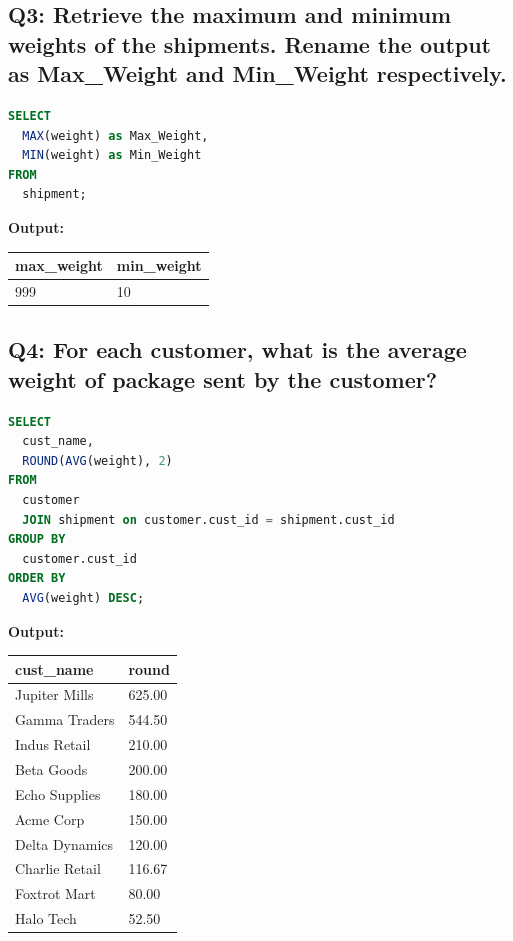 \documentclass[11pt, a4paper]{article}
\begin{document}
\subsection*{Q3: Retrieve the maximum and minimum weights of the shipments. Rename the output as Max\_Weight and Min\_Weight respectively.}
\begin{lstlisting}[language=SQL]
SELECT
  MAX(weight) as Max_Weight,
  MIN(weight) as Min_Weight
FROM
  shipment;
\end{lstlisting}
\vspace{0.3cm}
\textbf{Output:}\vspace{0.2cm}
\begin{center}
\begin{tabular}{|l|l|}
\hline
\textbf{max\_weight} & \textbf{min\_weight} \\ \hline
999 & 10 \\ \hline
\end{tabular}
\end{center}
\newpage
\subsection*{Q4: For each customer, what is the average weight of package sent by the customer?}
\begin{lstlisting}[language=SQL]
SELECT
  cust_name,
  ROUND(AVG(weight), 2)
FROM
  customer
  JOIN shipment on customer.cust_id = shipment.cust_id
GROUP BY
  customer.cust_id
ORDER BY
  AVG(weight) DESC;
\end{lstlisting}
\vspace{0.3cm}
\textbf{Output:}\vspace{0.2cm}
\begin{center}
\begin{tabular}{|l|l|}
\hline
\textbf{cust\_name} & \textbf{round} \\ \hline
Jupiter Mills & 625.00 \\ \hline
Gamma Traders & 544.50 \\ \hline
Indus Retail & 210.00 \\ \hline
Beta Goods & 200.00 \\ \hline
Echo Supplies & 180.00 \\ \hline
Acme Corp & 150.00 \\ \hline
Delta Dynamics & 120.00 \\ \hline
Charlie Retail & 116.67 \\ \hline
Foxtrot Mart & 80.00 \\ \hline
Halo Tech & 52.50 \\ \hline
\end{tabular}
\end{center}
\newpage
\end{document}
